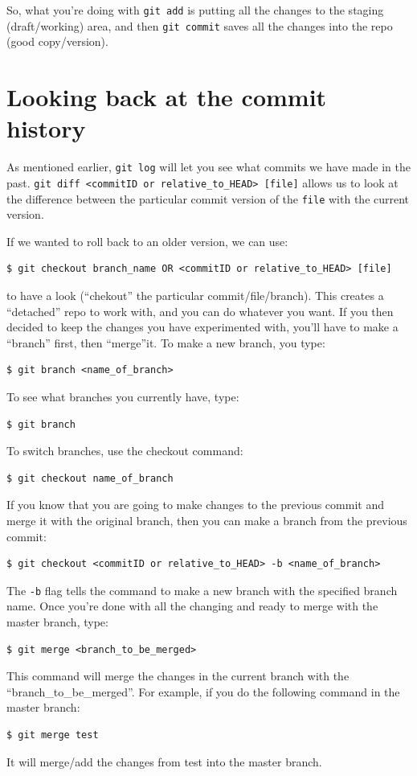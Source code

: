 \documentclass[a4paper, 12pt]{article}
\begin{document}
So, what you're doing with \verb|git add| is putting all the changes to the staging (draft/working) area, and then \verb|git commit| saves all the changes into the repo (good copy/version).

\section*{Looking back at the commit history}

As mentioned earlier, \verb|git log| will let you see what commits we have made in the past.
\verb|git diff <commitID or relative_to_HEAD> [file]| allows us to look at the difference between the particular commit version of the \verb|file| with the current version.

If we wanted to roll back to an older version, we can use:
\begin{lstlisting}
$ git checkout branch_name OR <commitID or relative_to_HEAD> [file]
\end{lstlisting}
to have a look (``chekout'' the particular commit/file/branch).
This creates a ``detached'' repo to work with, and you can do whatever you want.
If you then decided to keep the changes you have experimented with, you'll have to make a ``branch'' first, then ``merge''it.
To make a new branch, you  type:
\begin{lstlisting}
$ git branch <name_of_branch>
\end{lstlisting}
To see what branches you currently have, type:
\begin{lstlisting}
$ git branch
\end{lstlisting}
To switch branches, use the checkout command:
\begin{lstlisting}
$ git checkout name_of_branch
\end{lstlisting}
If you know that you are going to make changes to the previous commit and merge it with the original branch, then you can make a branch from the previous commit:
\begin{lstlisting}
$ git checkout <commitID or relative_to_HEAD> -b <name_of_branch>
\end{lstlisting}
The \verb|-b| flag tells the command to make a new branch with the specified branch name.
Once you're done with all the changing and ready to merge with the master branch, type:
\begin{lstlisting}
$ git merge <branch_to_be_merged>
\end{lstlisting}
This command will merge the changes in the current branch with the ``branch\_to\_be\_merged''.
For example, if you do the following command in the master branch:
\begin{lstlisting}
$ git merge test
\end{lstlisting}
It will merge/add the changes from test into the master branch.
\end{document}
